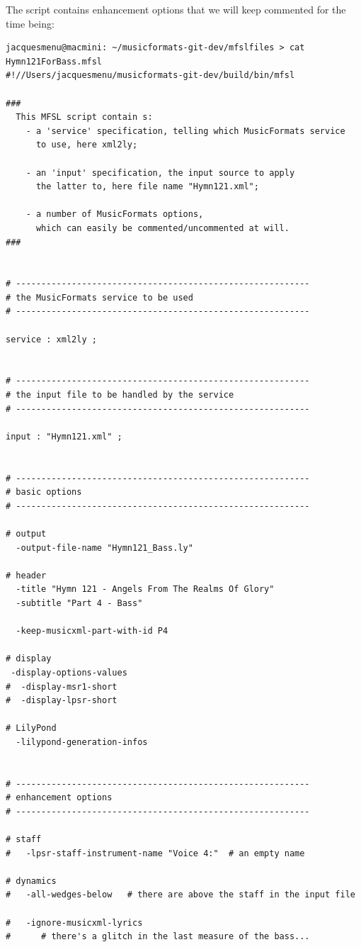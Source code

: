 The  script contains enhancement options that we will keep commented for the time being:
\begin{lstlisting}[language=MFSL]
jacquesmenu@macmini: ~/musicformats-git-dev/mfslfiles > cat Hymn121ForBass.mfsl
#!//Users/jacquesmenu/musicformats-git-dev/build/bin/mfsl

###
  This MFSL script contain s:
    - a 'service' specification, telling which MusicFormats service
      to use, here xml2ly;

    - an 'input' specification, the input source to apply
      the latter to, here file name "Hymn121.xml";

    - a number of MusicFormats options,
      which can easily be commented/uncommented at will.
###


# ----------------------------------------------------------
# the MusicFormats service to be used
# ----------------------------------------------------------

service : xml2ly ;


# ----------------------------------------------------------
# the input file to be handled by the service
# ----------------------------------------------------------

input : "Hymn121.xml" ;


# ----------------------------------------------------------
# basic options
# ----------------------------------------------------------

# output
  -output-file-name "Hymn121_Bass.ly"

# header
  -title "Hymn 121 - Angels From The Realms Of Glory"
  -subtitle "Part 4 - Bass"

  -keep-musicxml-part-with-id P4

# display
 -display-options-values
#  -display-msr1-short
#  -display-lpsr-short

# LilyPond
  -lilypond-generation-infos


# ----------------------------------------------------------
# enhancement options
# ----------------------------------------------------------

# staff
#   -lpsr-staff-instrument-name "Voice 4:"  # an empty name

# dynamics
#   -all-wedges-below   # there are above the staff in the input file

#   -ignore-musicxml-lyrics
#      # there's a glitch in the last measure of the bass...
\end{lstlisting}

